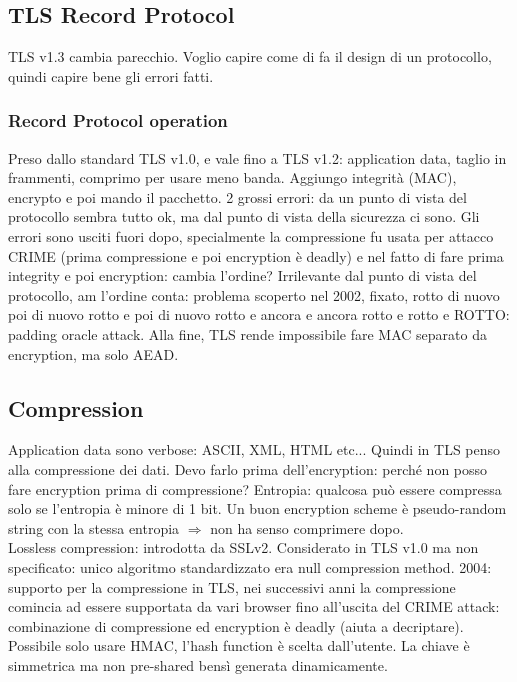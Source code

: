 \documentclass[16px]{article}
\begin{document}
\subsection{TLS Record Protocol}
TLS v1.3 cambia parecchio. Voglio capire come di fa il design di un protocollo, quindi capire bene gli errori fatti.
\subsubsection{Record Protocol operation}
Preso dallo standard TLS v1.0, e vale fino a TLS v1.2: application data, taglio in frammenti, comprimo per usare meno banda. Aggiungo integrità (MAC), encrypto e poi mando il pacchetto. 2 grossi errori: da un punto di vista del protocollo sembra tutto ok, ma dal punto di vista della sicurezza ci sono. Gli errori sono usciti fuori dopo, specialmente la compressione fu usata per attacco CRIME (prima compressione e poi encryption è deadly) e nel fatto di fare prima integrity e poi encryption: cambia l'ordine? Irrilevante dal punto di vista del protocollo, am l'ordine conta: problema scoperto nel 2002, fixato, rotto di nuovo poi di nuovo rotto e poi di nuovo rotto e ancora e ancora rotto e rotto e ROTTO: padding oracle attack. Alla fine, TLS rende impossibile fare MAC separato da encryption, ma solo AEAD.
\subsection{Compression}
Application data sono verbose: ASCII, XML, HTML etc... Quindi in TLS penso alla compressione dei dati. Devo farlo prima dell'encryption: perché non posso fare encryption prima di compressione? Entropia: qualcosa può essere compressa solo se l'entropia è minore di 1 bit. Un buon encryption scheme è pseudo-random string con la stessa entropia $\Rightarrow$ non ha senso comprimere dopo.\\ Lossless compression: introdotta da SSLv2. Considerato in TLS v1.0 ma non specificato: unico algoritmo standardizzato era null compression method. 2004: supporto per la compressione in TLS, nei successivi anni la compressione comincia ad essere supportata da vari browser fino all'uscita del CRIME attack: combinazione di compressione ed encryption è deadly (aiuta a decriptare).\\
Possibile solo usare HMAC, l'hash function è scelta dall'utente. La chiave è simmetrica ma non pre-shared bensì generata dinamicamente.
\end{document}
